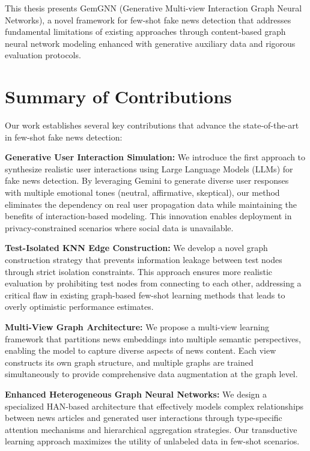 
This thesis presents GemGNN (Generative Multi-view Interaction Graph Neural Networks), a novel framework for few-shot fake news detection that addresses fundamental limitations of existing approaches through content-based graph neural network modeling enhanced with generative auxiliary data and rigorous evaluation protocols.

\section{Summary of Contributions}

Our work establishes several key contributions that advance the state-of-the-art in few-shot fake news detection:

\textbf{Generative User Interaction Simulation:} We introduce the first approach to synthesize realistic user interactions using Large Language Models (LLMs) for fake news detection. By leveraging Gemini to generate diverse user responses with multiple emotional tones (neutral, affirmative, skeptical), our method eliminates the dependency on real user propagation data while maintaining the benefits of interaction-based modeling. This innovation enables deployment in privacy-constrained scenarios where social data is unavailable.

\textbf{Test-Isolated KNN Edge Construction:} We develop a novel graph construction strategy that prevents information leakage between test nodes through strict isolation constraints. This approach ensures more realistic evaluation by prohibiting test nodes from connecting to each other, addressing a critical flaw in existing graph-based few-shot learning methods that leads to overly optimistic performance estimates.

\textbf{Multi-View Graph Architecture:} We propose a multi-view learning framework that partitions news embeddings into multiple semantic perspectives, enabling the model to capture diverse aspects of news content. Each view constructs its own graph structure, and multiple graphs are trained simultaneously to provide comprehensive data augmentation at the graph level.

\textbf{Enhanced Heterogeneous Graph Neural Networks:} We design a specialized HAN-based architecture that effectively models complex relationships between news articles and generated user interactions through type-specific attention mechanisms and hierarchical aggregation strategies. Our transductive learning approach maximizes the utility of unlabeled data in few-shot scenarios.

